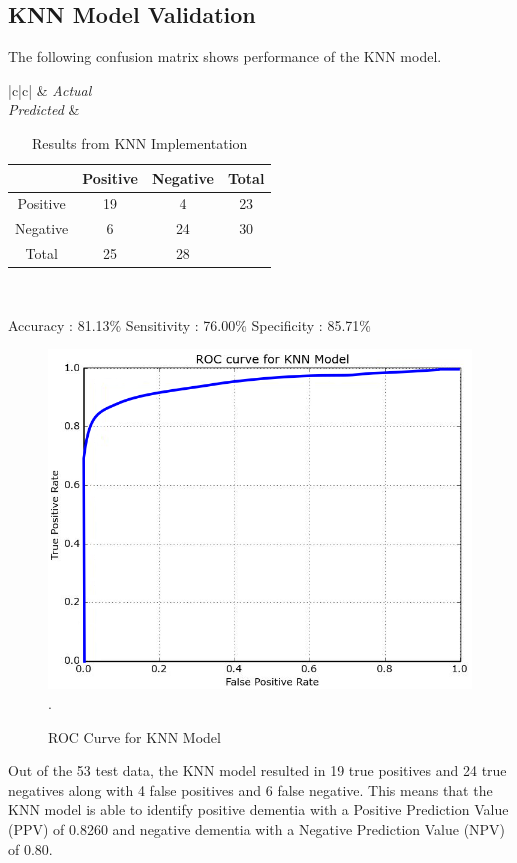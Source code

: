 \documentclass[journal,twoside]{IEEEtran}
\begin{document}
\subsection{KNN Model Validation}
\par The following confusion matrix shows performance of the KNN model.
\newline
\begin{table}[h!]
	\centering
    \begin{tabular}{|c|c|}
  	\hline
  	& \emph{Actual} \\
  	\hline
  	\emph{Predicted} & 
  	\begin{tabular}{c |c c c}
    	& Positive & Negative & Total \\
        \hline
        Positive & 19 & 4 & 23 \\
        Negative & 6 & 24 & 30 \\
        Total & 25 & 28 &  \\
	\end{tabular}
 	\\
  	\hline
	\end{tabular}
    \caption{Results from KNN Implementation}
\end{table}
\newline Accuracy : 81.13\%
\newline Sensitivity : 76.00\%
\newline Specificity : 85.71\%
\begin{figure}[h!]
\centering
\includegraphics[scale=.40]{KNN_ROC.png}
\DeclareGraphicsExtensions.
\caption{ROC Curve for KNN Model}
\end{figure}
\newline
\par Out of the 53 test data, the KNN model resulted in 19 true positives and 24 true negatives along with 4 false positives and 6 false negative. This means that the KNN model is able to identify positive dementia with a Positive Prediction Value (PPV) of 0.8260 and negative dementia with a Negative Prediction Value (NPV) of 0.80.
\end{document}
